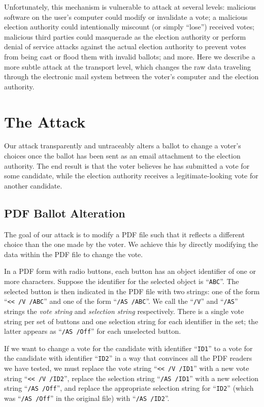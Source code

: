 \documentclass{article}
\begin{document}
Unfortunately, this mechanism is vulnerable to attack at several
levels: malicious software on the user's computer could modify or
invalidate a vote; a malicious election authority could intentionally
miscount (or simply ``lose'') received votes; malicious third parties
could masquerade as the election authority or perform denial of
service attacks against the actual election authority to prevent votes
from being cast or flood them with invalid ballots; and more. Here
we describe a more subtle attack at the transport level, which changes
the raw data traveling through the electronic mail system between the
voter's computer and the election authority.

\section{The Attack}

Our attack transparently and untraceably alters a ballot to change a
voter's choices once the ballot has been sent as an email attachment
to the election authority. The end result is that the voter believes
he has submitted a vote for some candidate, while the election
authority receives a legitimate-looking vote for another candidate.

\subsection{PDF Ballot Alteration}

The goal of our attack is to modify a PDF file such that it reflects a
different choice than the one made by the voter. We achieve this by
directly modifying the data within the PDF file to change the
vote. 

In a PDF form with radio buttons, each button has an object identifier
of one or more characters. Suppose the identifier for the selected
object is ``\texttt{ABC}''. The selected button is then indicated in
the PDF file with two strings: one of the form ``\texttt{<{}< /V
  /ABC}'' and one of the form ``\texttt{/AS /ABC}''. We call the
``\texttt{/V}'' and ``\texttt{/AS}'' strings the \emph{vote string}
and \emph{selection string} respectively. There is a single vote
string per set of buttons and one selection string for each identifier
in the set; the latter appears as ``\texttt{/AS /Off}'' for each
unselected button.

If we want to change a vote for the candidate with identifier
``\texttt{ID1}'' to a vote for the candidate with identifier
``\texttt{ID2}'' in a way that convinces all the PDF readers we have
tested, we must replace the vote string ``\texttt{<{}< /V /ID1}'' with
a new vote string ``\texttt{<{}< /V /ID2}'', replace the selection
string ``\texttt{/AS /ID1}'' with a new selection string ``\texttt{/AS
  /Off}'', and replace the appropriate selection string for
``\texttt{ID2}'' (which was ``\texttt{/AS /Off}'' in the original
file) with ``\texttt{/AS /ID2}''.
\end{document}
